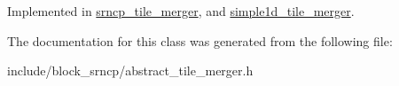Implemented in \hyperlink{classsrncp__tile__merger_a8513af3c4d4dd03ef9b50973edafb01b}{srncp\-\_\-tile\-\_\-merger}, and \hyperlink{classsimple1d__tile__merger_a33c12f0c71ad8d05a4644d027060a17b}{simple1d\-\_\-tile\-\_\-merger}.



The documentation for this class was generated from the following file\-:\begin{DoxyCompactItemize}
\item 
include/block\-\_\-srncp/abstract\-\_\-tile\-\_\-merger.\-h\end{DoxyCompactItemize}
